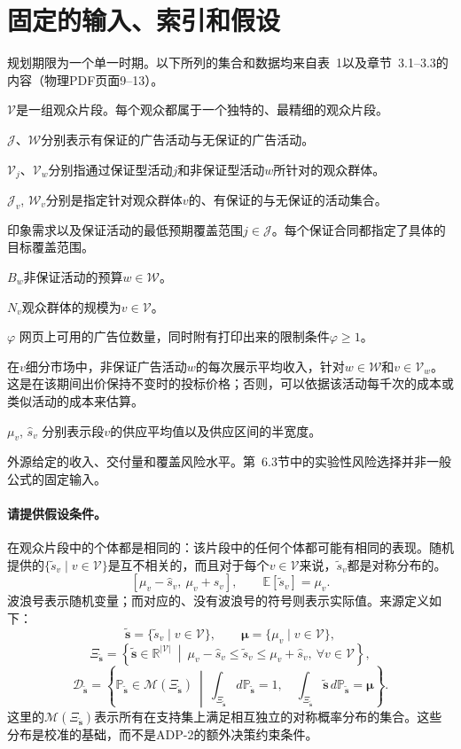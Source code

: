 \documentclass{article}
\begin{document}
\section*{固定的输入、索引和假设}
规划期限为一个单一时期。以下所列的集合和数据均来自表~1以及章节~3.1–3.3的内容（物理PDF页面9–13）。
\begin{description}
\item$\mathcal V$是一组观众片段。每个观众都属于一个独特的、最精细的观众片段。
\item$\mathcal J$、$\mathcal W$分别表示有保证的广告活动与无保证的广告活动。
\item$\mathcal V_j$、$\mathcal V_w$分别指通过保证型活动$j$和非保证型活动$w$所针对的观众群体。
\item$\mathcal J_v$, $\mathcal W_v$分别是指定针对观众群体$v$的、有保证的与无保证的活动集合。
\item[$D_j$, $R_j$] 印象需求以及保证活动的最低预期覆盖范围$j\in\mathcal J$。每个保证合同都指定了具体的目标覆盖范围。
\item$B_w$非保证活动的预算$w\in\mathcal W$。
\item$N_v$观众群体的规模为$v\in\mathcal V$。
\item$\varphi$ 网页上可用的广告位数量，同时附有打印出来的限制条件$\varphi\geq1$。
\item[$e_{vw}$] 在$v$细分市场中，非保证广告活动$w$的每次展示平均收入，针对$w\in\mathcal W$和$v\in\mathcal V_w$。这是在该期间出价保持不变时的投标价格；否则，可以依据该活动每千次的成本或类似活动的成本来估算。
\item$\mu_v$, $\hat s_v$ 分别表示段$v$的供应平均值以及供应区间的半宽度。
\item[$\varepsilon$, $\varepsilon^d_j$, $\varepsilon^r_j$] 外源给定的收入、交付量和覆盖风险水平。第~6.3节中的实验性风险选择并非一般公式的固定输入。
\end{description}

\paragraph{请提供假设条件。}
在观众片段中的个体都是相同的：该片段中的任何个体都可能有相同的表现。随机提供的$\{\tilde s_v\mid v\in\mathcal V\}$是互不相关的，而且对于每个$v\in\mathcal V$来说，$\tilde s_v$都是对称分布的。
\[
[\mu_v-\hat s_v,\ \mu_v+\hat s_v],\qquad
\mathbb E[\tilde s_v]=\mu_v.
\]
波浪号表示随机变量；而对应的、没有波浪号的符号则表示实际值。来源定义如下：
\[
\tilde{\boldsymbol s}=\{\tilde s_v\mid v\in\mathcal V\},\qquad
\boldsymbol\mu=\{\mu_v\mid v\in\mathcal V\},
\]
\[
\Xi_{\tilde{\boldsymbol s}}=
\left\{\tilde{\boldsymbol s}\in\mathbb R^{|\mathcal V|}\ \middle|\
\mu_v-\hat s_v\leq\tilde s_v\leq\mu_v+\hat s_v,\ \forall v\in\mathcal V\right\},
\]
\[
\mathcal D_{\tilde{\boldsymbol s}}=
\left\{\mathbb P_{\tilde{\boldsymbol s}}\in\mathcal M(\Xi_{\tilde{\boldsymbol s}})\ \middle|\
\int_{\Xi_{\tilde{\boldsymbol s}}}d\mathbb P_{\tilde{\boldsymbol s}}=1,\quad
\int_{\Xi_{\tilde{\boldsymbol s}}}\tilde{\boldsymbol s}\,d\mathbb P_{\tilde{\boldsymbol s}}=\boldsymbol\mu
\right\}.
\]
这里的$\mathcal M(\Xi_{\tilde{\boldsymbol s}})$表示所有在支持集上满足相互独立的对称概率分布的集合。这些分布是校准的基础，而不是ADP-2的额外决策约束条件。
\end{document}
